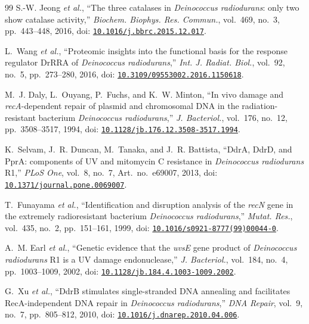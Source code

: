 \documentclass[conference]{IEEEtran}
\begin{document}
\begin{thebibliography}{99}
S.-W. Jeong \emph{et al.}, ``The three catalases in \emph{Deinococcus radiodurans}: only two show
catalase activity,'' \emph{Biochem. Biophys. Res. Commun.}, vol.~469, no.~3, pp.~443--448, 2016,
doi: \href{https://doi.org/10.1016/j.bbrc.2015.12.017}{\nolinkurl{10.1016/j.bbrc.2015.12.017}}.

L.~Wang \emph{et al.}, ``Proteomic insights into the functional basis for the response regulator
DrRRA of \emph{Deinococcus radiodurans},'' \emph{Int. J. Radiat. Biol.}, vol.~92, no.~5,
pp.~273--280, 2016,
doi: \href{https://doi.org/10.3109/09553002.2016.1150618}{\nolinkurl{10.3109/09553002.2016.1150618}}.

M.~J. Daly, L.~Ouyang, P.~Fuchs, and K.~W. Minton, ``In vivo damage and \emph{recA}-dependent
repair of plasmid and chromosomal DNA in the radiation-resistant bacterium \emph{Deinococcus
radiodurans},'' \emph{J. Bacteriol.}, vol.~176, no.~12, pp.~3508--3517, 1994,
doi: \href{https://doi.org/10.1128/jb.176.12.3508-3517.1994}{\nolinkurl{10.1128/jb.176.12.3508-3517.1994}}.

K.~Selvam, J.~R. Duncan, M.~Tanaka, and J.~R. Battista, ``DdrA, DdrD, and PprA: components of UV
and mitomycin C resistance in \emph{Deinococcus radiodurans} R1,'' \emph{PLoS One}, vol.~8,
no.~7, Art.~no.~e69007, 2013,
doi: \href{https://doi.org/10.1371/journal.pone.0069007}{\nolinkurl{10.1371/journal.pone.0069007}}.

T.~Funayama \emph{et al.}, ``Identification and disruption analysis of the \emph{recN} gene in
the extremely radioresistant bacterium \emph{Deinococcus radiodurans},'' \emph{Mutat. Res.},
vol.~435, no.~2, pp.~151--161, 1999,
doi: \href{https://doi.org/10.1016/s0921-8777(99)00044-0}{\nolinkurl{10.1016/s0921-8777(99)00044-0}}.

A.~M. Earl \emph{et al.}, ``Genetic evidence that the \emph{uvsE} gene product of
\emph{Deinococcus radiodurans} R1 is a UV damage endonuclease,'' \emph{J. Bacteriol.},
vol.~184, no.~4, pp.~1003--1009, 2002,
doi: \href{https://doi.org/10.1128/jb.184.4.1003-1009.2002}{\nolinkurl{10.1128/jb.184.4.1003-1009.2002}}.

G.~Xu \emph{et al.}, ``DdrB stimulates single-stranded DNA annealing and facilitates
RecA-independent DNA repair in \emph{Deinococcus radiodurans},'' \emph{DNA Repair}, vol.~9,
no.~7, pp.~805--812, 2010,
doi: \href{https://doi.org/10.1016/j.dnarep.2010.04.006}{\nolinkurl{10.1016/j.dnarep.2010.04.006}}.


\end{thebibliography}
\end{document}
